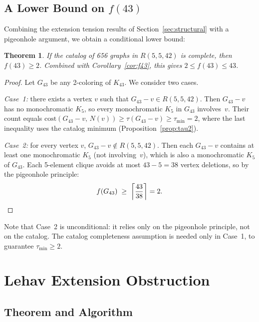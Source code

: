 \documentclass[11pt,a4paper]{article}
\newtheorem{theorem}{Theorem}
\theoremstyle{definition}
\theoremstyle{remark}
\newcommand{\Kn}[1]{K_{#1}}
\newcommand{\Rset}[3]{R(#1,#2,#3)}
\begin{document}
\subsection{A Lower Bound on $f(43)$}

Combining the extension tension results of
Section~\ref{sec:structural} with a pigeonhole argument,
we obtain a conditional lower bound:

\begin{theorem}\label{thm:f43-lower}
If the catalog of 656 graphs in $\Rset{5}{5}{42}$ is complete,
then $f(43) \geq 2$.  Combined with Corollary~\ref{cor:f43},
this gives $2 \leq f(43) \leq 43$.
\end{theorem}

\begin{proof}
Let $G_{43}$ be any 2-coloring of $\Kn{43}$.
We consider two cases.

\emph{Case~1:} there exists a vertex $v$ such that
$G_{43} - v \in \Rset{5}{5}{42}$.
Then $G_{43} - v$ has no monochromatic $K_5$, so every
monochromatic $K_5$ in $G_{43}$ involves~$v$.
Their count equals $\mathrm{cost}(G_{43} - v,\, N(v))
\geq \tau(G_{43} - v) \geq \tau_{\min} = 2$,
where the last inequality uses the catalog minimum
(Proposition~\ref{prop:tau2}).

\emph{Case~2:} for every vertex $v$,
$G_{43} - v \notin \Rset{5}{5}{42}$.
Then each $G_{43} - v$ contains at least one monochromatic $K_5$
(not involving~$v$), which is also a monochromatic $K_5$ of $G_{43}$.
Each 5-element clique avoids at most $43 - 5 = 38$ vertex deletions,
so by the pigeonhole principle:
\[
  f(G_{43}) \;\geq\; \left\lceil \frac{43}{38} \right\rceil = 2.
  \qedhere
\]
\end{proof}

Note that Case~2 is unconditional: it relies only on the pigeonhole
principle, not on the catalog.  The catalog completeness assumption
is needed only in Case~1, to guarantee $\tau_{\min} \geq 2$.

\section{Lehav Extension Obstruction}
\label{sec:lehav}

\subsection{Theorem and Algorithm}
\end{document}
